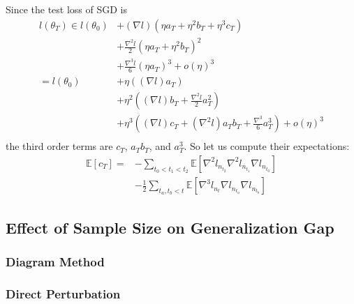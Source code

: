 \documentclass{article}
\newcommand{\expct}[1]{\mathbb{E}\left[#1\right]}
\newcommand{\wrap}[1]{\left(#1\right)}
\begin{document}
        Since the test loss of SGD is
        \begin{align*}
            l(\theta_T)
            \in
                    l(\theta_0)
            &+     (\nabla   l)(\eta a_T + \eta^2 b_T + \eta^3 c_T)                         \\
            &+\frac{\nabla^2 l}{2}(\eta a_T + \eta^2 b_T             )^2                    \\
            &+\frac{\nabla^3 l}{6}(\eta a_T                          )^3 
             +o(\eta)^3                                                                     \\
            =
                l(\theta_0)
            &+  \eta       \wrap{(\nabla l) a_T                               }                 \\
            &+  \eta^2     \wrap{(\nabla l) b_T + \frac{\nabla^2 l}{2} a_T^2  }                 \\
            &+  \eta^3     \wrap{(\nabla l) c_T + (\nabla^2 l) a_T b_T + \frac{\nabla^3}{6} a_T^3}
             +o(\eta)^3                                                                     \\
        \end{align*}
        the third order terms are $c_T$, $a_T b_T$, and $a_T^3$.  So let us
        compute their expectations:
        \begin{align*}
            \expct{c_T} =
               &-\sum_{t_0 < t_1 < t_2} 
                 \expct{\nabla^2 l_{n_{t_2}} \nabla^2 l_{n_{t_1}} \nabla l_{n_{t_0}}}
               \\
               &-\frac{1}{2} \sum_{t_a, t_b < t}
                 \expct{\nabla^3 l_{n_t} \nabla l_{n_{t_a}} \nabla l_{n_{t_b}}}
        \end{align*}


    \subsection*{Effect of Sample Size on Generalization Gap}
        \subsubsection*{Diagram Method}
            
        \subsubsection*{Direct Perturbation}
\end{document}
